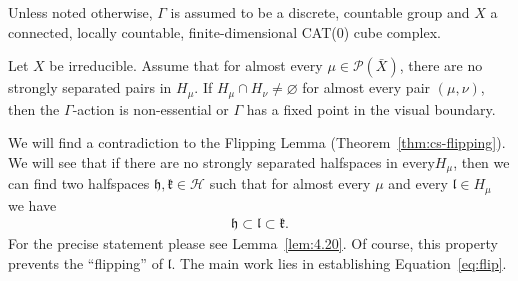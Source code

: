 Unless noted otherwise, \(\Gamma\) is assumed to be a discrete, countable group and \(X\) a connected, locally countable, finite-dimensional CAT(0) cube complex.



\begin{prop}[{\cite[Corollary~4.21]{MR3509968}}]
  \label{prop:4.21}
  Let \(X\) be irreducible. Assume that for almost every \(\mu \in \mathcal{P}(\bar X)\), there are no strongly separated pairs in \(H_\mu\). If \(H_\mu \cap H_\nu \neq \varnothing\) for almost every pair \((\mu, \nu)\), then the \(\Gamma\)-action is non-essential or \(\Gamma\) has a fixed point in the visual boundary.
\end{prop}

We will find a contradiction to the Flipping Lemma (Theorem~\ref{thm:cs-flipping}). We will see that if there are no strongly separated halfspaces in every\(H_\mu\), then we can find two halfspaces \(\mathfrak{h}, \mathfrak{k} \in \mathcal{H}\) such that for almost every \(\mu\) and every \(\mathfrak{l} \in H_\mu\) we have
\begin{align}
  \mathfrak{h} \subset \mathfrak{l} \subset \mathfrak{k}.\label{eq:flip}
\end{align}
For the precise statement please see Lemma~\ref{lem:4.20}. Of course, this property prevents the \enquote{flipping} of \(\mathfrak{l}\). The main work lies in establishing Equation~\eqref{eq:flip}.

